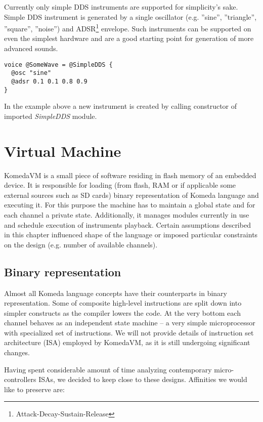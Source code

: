 \documentclass{article}
\begin{document}
Currently only simple DDS\cite{DDS} instruments are supported for simplicity's
sake.  Simple DDS instrument is generated by a single oscillator (e.g.
''sine'', ''triangle'', ''square'', ''noise'') and
ADSR\footnote{Attack-Decay-Sustain-Release} envelope.  Such instruments can be
supported on even the simplest hardware and are a good starting point for
generation of more advanced sounds.

\begin{lstlisting}[caption=Example voice definition]
voice @SomeWave = @SimpleDDS {
  @osc "sine"
  @adsr 0.1 0.1 0.8 0.9
}
\end{lstlisting}

In the example above a new instrument is created by calling constructor of
imported {\em SimpleDDS} module.

\section{Virtual Machine}

KomedaVM is a small piece of software residing in flash memory of an embedded
device. It is responsible for loading (from flash, RAM or if applicable some
external sources such as SD cards) binary representation of Komeda language and
executing it.  For this purpose the machine has to maintain a global state and
for each channel a private state. Additionally, it manages modules currently in
use and schedule execution of instruments playback. Certain assumptions
described in this chapter influenced shape of the language or imposed
particular constraints on the design (e.g. number of available channels).  

\subsection{Binary representation}

Almost all Komeda language concepts have their counterparts in binary
representation.  Some of composite high-level instructions are split down into
simpler constructs as the compiler lowers the code.  At the very bottom each
channel behaves as an independent state machine -- a very simple microprocessor
with specialized set of instructions.  We will not provide details of
instruction set architecture (ISA) employed by KomedaVM, as it is still
undergoing significant changes.

Having spent considerable amount of time analyzing contemporary
micro-controllers ISAs, we decided to keep close to these designs. Affinities
we would like to preserve are:
\end{document}
